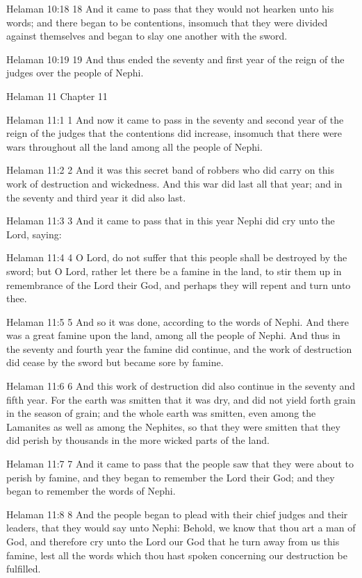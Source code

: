 Helaman 10:18
 18 And it came to pass that they would not hearken unto his
words; and there began to be contentions, insomuch that they were
divided against themselves and began to slay one another with the
sword.

Helaman 10:19
 19 And thus ended the seventy and first year of the reign of the
judges over the people of Nephi.

Helaman 11
Chapter 11

Helaman 11:1
 1 And now it came to pass in the seventy and second year of the
reign of the judges that the contentions did increase, insomuch
that there were wars throughout all the land among all the people
of Nephi.

Helaman 11:2
 2 And it was this secret band of robbers who did carry on this
work of destruction and wickedness. And this war did last all
that year; and in the seventy and third year it did also last.

Helaman 11:3
 3 And it came to pass that in this year Nephi did cry unto the
Lord, saying:

Helaman 11:4
 4 O Lord, do not suffer that this people shall be destroyed by
the sword; but O Lord, rather let there be a famine in the land,
to stir them up in remembrance of the Lord their God, and perhaps
they will repent and turn unto thee.

Helaman 11:5
 5 And so it was done, according to the words of Nephi. And
there was a great famine upon the land, among all the people of
Nephi. And thus in the seventy and fourth year the famine did
continue, and the work of destruction did cease by the sword but
became sore by famine.

Helaman 11:6
 6 And this work of destruction did also continue in the seventy
and fifth year. For the earth was smitten that it was dry, and
did not yield forth grain in the season of grain; and the whole
earth was smitten, even among the Lamanites as well as among the
Nephites, so that they were smitten that they did perish by
thousands in the more wicked parts of the land.

Helaman 11:7
 7 And it came to pass that the people saw that they were about
to perish by famine, and they began to remember the Lord their
God; and they began to remember the words of Nephi.

Helaman 11:8
 8 And the people began to plead with their chief judges and
their leaders, that they would say unto Nephi: Behold, we know
that thou art a man of God, and therefore cry unto the Lord our
God that he turn away from us this famine, lest all the words
which thou hast spoken concerning our destruction be fulfilled.

